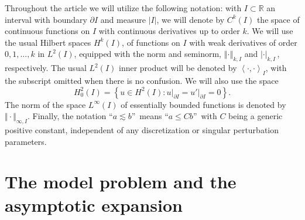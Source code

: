 \documentclass[12pt]{article}
\begin{document}
Throughout the article we will utilize the following notation: with $I\subset \mathbb{R}$ an interval with boundary $\partial I$ and measure $\left\vert I\right\vert $, we will denote by $C^{k}(I)$ the space
of continuous functions on $I$ with continuous derivatives up to order $k$.
We will use the usual Hilbert spaces $H^{k}\left( I\right)$, of functions on $I$
with weak derivatives of order $0,1,\ldots,k$ in $L^2(I)$, equipped
with the norm and seminorm,  $\left\Vert \cdot \right\Vert _{k,I}$
and $\left\vert \cdot \right\vert _{k,I}\,$, respectively. The usual $%
L^{2}(I)$ inner product will be denoted by $\left\langle \cdot ,\cdot
\right\rangle _{I}$, with the subscript omitted when there is no confusion.
We will also use the space 
\begin{equation*}
H_{0}^{2}\left( I\right) =\left\{ u\in H^{2}\left( I\right) :\left.
u\right\vert _{\partial I}=\left. u' \right\vert
_{\partial I}=0\right\} .
\end{equation*}%
The norm of the space $L^{\infty }(I)$ of essentially bounded functions is
denoted by $\Vert \cdot \Vert _{\infty ,I}$. Finally, the notation
\textquotedblleft $a\lesssim b$\textquotedblright\ means \textquotedblleft $%
a\leq Cb$\textquotedblright\ with $C$ being a generic positive constant,
independent of any discretization or singular perturbation parameters.


\section{The model problem and the asymptotic expansion\label{model}}
\end{document}
